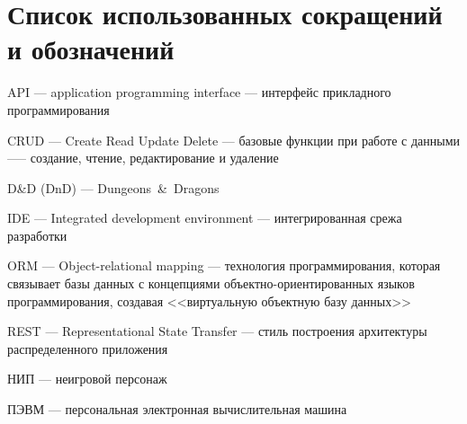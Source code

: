 \section*{Список использованных сокращений и обозначений}

\noindent API --- application programming interface --- интерфейс прикладного программирования

\noindent CRUD --- Create Read Update Delete --- базовые функции при работе с данными —-- создание, чтение, редактирование и удаление

\noindent D\&D (DnD) --- Dungeons~\&~Dragons

\noindent IDE --- Integrated development environment --- интегрированная срежа разработки

\noindent ORM --- Object-relational mapping --- технология программирования, которая связывает базы данных с концепциями объектно-ориентированных языков программирования, создавая <<виртуальную объектную базу данных>>

\noindent REST --- Representational State Transfer --- стиль построения архитектуры распределенного приложения

\noindent НИП --- неигровой персонаж

\noindent ПЭВМ --- персональная электронная вычислительная машина

\pagebreak
